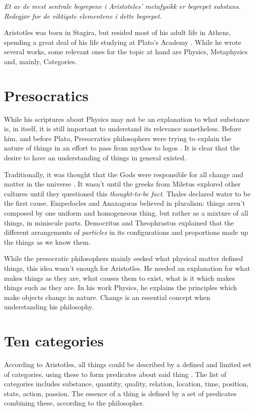 \documentclass{myassignment}
\begin{document}
\textit{Et av de mest sentrale begrepene i Aristoteles’ metafysikk er begrepet substans.  Redegjør for de viktigste elementene i dette begrepet.}

Aristotles was born in Stagira, but resided most of his adult life in Athens, spending a great deal of his life studying at Plato's Academy \autocite{sep-aristotle}. While he wrote several works, some relevant ones for the topic at hand are Physics, Metaphysics and, mainly, Categories.

\section{Presocratics}
While his scriptures about Physics may not be an explanation to what substance is, in itself, it is still important to understand its relevance nonetheless. Before him, and before Plato, Presocratics philosophers were trying to explain the nature of things in an effort to pass from mythos to logos \autocite{sep-presocratics}. It is clear that the desire to have an understanding of things in general existed.

Traditionally, it was thought that the Gods were responsible for all change and matter in the universe \autocite{knopf2009}. It wasn't until the greeks from Miletus explored other cultures until they questioned this \textit{thought-to-be fact}. Thales declared water to be the first cause. Empedocles and Anaxagoras believed in pluralism: things aren't composed by one uniform and homogeneous thing, but rather as a mixture of all things, in miniscule parts. Democritus and Theophrastus explained that the different arrangements of \textit{particles} in its configurations and proportions made up the things as we know them.

While the presocratic philosophers mainly seeked what physical matter defined things, this idea wasn't enough for Aristotles. He needed an explanation for what makes things as they are, what causes them to exist, what is it which makes things such as they are. In his work Physics, he explains the principles which make objects change in nature. Change is an essential concept when understanding his philosophy.

\section{Ten categories}
According to Aristotles, all things could be described by a defined and limited set of categories, using these to form predicates about said thing \autocite{aristoteles-categories}. The list of categories includes substance, quantity, quality, relation, location, time, position, state, action, passion. The essence of a thing is defined by a set of predicates combining these, according to the philosopher.
\end{document}
